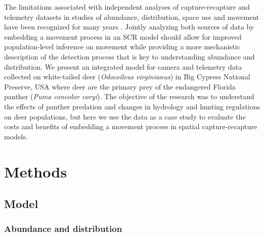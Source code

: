 \documentclass[12pt]{article}
\begin{document}
The limitations associated with independent analyses of
capture-recapture and telemetry datasets in studies of 
abundance, distribution, space use and movement have been recognized
for many years \citep[pp. 534--535]{royle_etal:2014}.
Jointly analyzing both sources of data by embedding a movement process
in an SCR model should allow for improved population-level inference
on movement while providing a more mechanistic description of the
detection process that is key to understanding abundance and
distribution. 
We present an integrated model for camera and telemetry data 
collected on white-tailed deer  ({\it Odocoileus virginianus}) in
Big Cypress National Preserve, USA where deer are the primary prey of
the endangered Florida panther ({\it Puma concolor coryi}). 
The objective of the research was to understand the effects of panther
predation and changes in hydrology and hunting regulations on deer
populations, but here we use the data as a case study to evaluate the
costs and benefits of embedding a movement process in spatial
capture-recapture models. 


\section{Methods}

\subsection{Model}

\subsubsection{Abundance and distribution}
\end{document}
